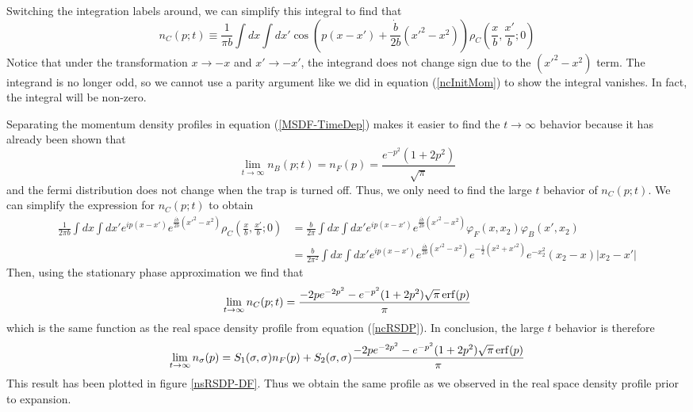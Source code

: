 \documentclass[onecolumn,english,aps,pra]{revtex4}
\begin{document}
Switching the integration labels around, we can simplify this integral to find that 
\begin{equation}
n_C(p;t) \equiv \frac{1}{\pi b} \int dx \int dx' \cos(p(x-x') + \frac{\dot{b}}{2b}(x'^2 - x^2))
\rho_C\left(\frac{x}{b},\frac{x'}{b};0\right)
\end{equation}
Notice that under the transformation $x\rightarrow -x$ and $x' \rightarrow -x'$, the integrand does not change sign due to the $(x'^2 -x^2)$ term. The integrand is no longer odd, so we cannot use a parity argument like we did in equation (\ref{ncInitMom}) to show the integral vanishes. In fact, the integral will be non-zero. 

Separating the momentum density profiles in equation (\ref{MSDF-TimeDep}) makes it  easier to find the $t \rightarrow \infty$ behavior because it has already been shown \cite{minguzzi2005exact} that
\begin{equation}
\lim_{t \rightarrow \infty} n_B(p;t) = n_F(p) = \frac{e^{-p^2}(1+2p^2)}{\sqrt{\pi}}
\end{equation}
and the fermi distribution does not change when the trap is turned off. Thus, we only need to find the large $t$ behavior of $n_C(p;t)$. We can simplify the expression for $n_C(p;t)$ to obtain
\begin{align*}
\frac{1}{2\pi b} \int dx \int dx' e^{ip(x-x')} e^{\frac{i\dot{b}}{2b}(x'^2 - x^2)}
\rho_C\left(\frac{x}{b},\frac{x'}{b};0\right) 
&= \frac{b}{2\pi} \int dx \int dx' e^{ip(x-x')} e^{\frac{i\dot{b}}{2b}(x'^2 - x^2)}
\varphi_F(x,x_2)\varphi_B(x',x_2)\\
&= \frac{b}{2\pi^2} \int dx \int dx' e^{ip(x-x')} e^{\frac{i\dot{b}}{2b}(x'^2 - x^2)}
e^{-\frac{1}{2}(x^2 + x'^2)}e^{-x_2^2} (x_2 -x)|x_2 - x'|
\end{align*}
Then, using the stationary phase approximation we find that
\begin{equation}
\lim_{t \rightarrow \infty} n_C(p;t) = \frac{-2pe^{-2p^2} - e^{-p^2}(1+2p^2)\sqrt{\pi}\erf(p)}{\pi}  
\end{equation}
which is the same function as the real space density profile from equation (\ref{ncRSDP}). In conclusion, the large $t$ behavior is therefore
\begin{equation}
\lim_{t \rightarrow \infty} n_\sigma(p) = S_1(\sigma, \sigma)n_F(p) + S_2(\sigma,\sigma) \frac{-2pe^{-2p^2} - e^{-p^2}(1+2p^2)\sqrt{\pi}\erf(p)}{\pi}
\end{equation} 
This result has been plotted in figure \ref{nsRSDP-DF}. Thus we obtain the same profile as we observed in the real space density profile prior to expansion.
\end{document}
